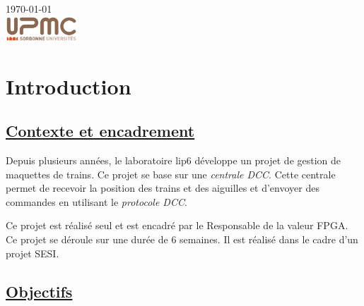 \begin{titlepage}
{\large \today}\\[2cm] %


\includegraphics[width=0.2\textwidth]{logo.png}


\vfill %

\end{titlepage}




\section{Introduction}
\label{sec:introduction}

\subsection{\underline{Contexte et encadrement}}

Depuis plusieurs ann\'ees, le laboratoire lip6 d\'eveloppe un projet de
gestion de maquettes de trains. Ce projet se base sur une
\emph{centrale DCC}. Cette centrale permet de recevoir la position des
trains et des aiguilles et d'envoyer des commandes en utilisant le
\emph{protocole DCC}.

Ce projet est r\'ealis\'e seul et est encadr\'e par le Responsable de la
valeur FPGA. Ce projet se d\'eroule sur une dur\'ee de 6 semaines.
Il est r\'ealis\'e dans le cadre d'un projet SESI.

\subsection{\underline{Objectifs}}

